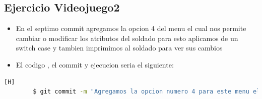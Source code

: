 \documentclass{article}
\begin{document}
	\subsection{Ejercicio Videojuego2}
	\begin{itemize}	
		\item En el septimo commit agregamos la opcion 4 del menu el cual nos permite cambiar o modificar los atributos del soldado para esto aplicamos de un switch case y tambien imprimimos al soldado para ver sus cambios
		\item El codigo , el commit y ejecucion seria el siguiente:
	\end{itemize}	
	\begin{lstlisting}[language=bash,caption={Commit}][H]
		$ git commit -m "Agregamos la opcion numero 4 para este menu el cual nos permite modificar atributos del soldado el cual escogimos"
	\end{lstlisting}	
\end{document}
